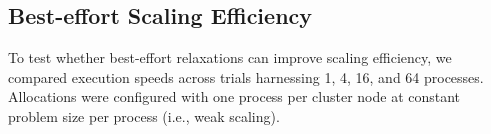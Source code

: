 

\vspace{-4.0ex}
\subsection{Best-effort Scaling Efficiency}
\label{moreno:sec:case1:scaling-efficiency}
\vspace{-2.0ex}

To test whether best-effort relaxations can improve scaling efficiency, we compared execution speeds across trials harnessing 1, 4, 16, and 64 processes.
Allocations were configured with one process per cluster node at constant problem size per process (i.e., weak scaling).


